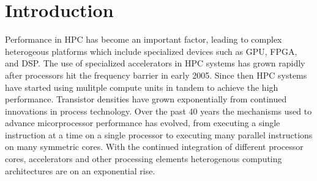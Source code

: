 \section{Introduction}
\label{introduction}

Performance in HPC has become an important factor, leading to complex
heterogeous platforms which include specialized devices such as GPU, FPGA, and
DSP. The use of specialized accelerators in HPC systems has grown rapidly after
processors hit the frequency barrier in early 2005. Since then HPC systems have
started using mulitple compute units in tandem to achieve the high performance.
Transistor densities have grown exponentially from continued innovations in
process technology. Over the past 40 years the mechanisms used to advance
micorprocessor performance has evolved, from executing a single instruction at a
time on a single processor to executing many parallel instructions on many
symmetric cores. With the continued integration of different processor cores,
accelerators and other processing elements heterogenous computing architectures
are on an exponential rise.
